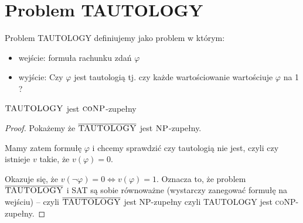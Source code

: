 \section{Problem TAUTOLOGY}

\begin{definition}
	Problem \textsc{TAUTOLOGY} definiujemy jako problem w którym:
	\begin{itemize}
		\item wejście: formuła rachunku zdań \( \varphi \)
		\item wyjście: Czy \( \varphi \) jest tautologią tj. czy każde wartościowanie wartościuje \( \varphi \) na 1 ?
	\end{itemize}
\end{definition}

\begin{theorem}
	\( \textsc{TAUTOLOGY} \) jest \( \textsc{coNP} \)-zupełny
\end{theorem}
\begin{proof}
	Pokażemy że \( \overline{\textsc{TAUTOLOGY}} \) jest \( \textsc{NP} \)-zupełny.

	Mamy zatem formułę \( \varphi \) i chcemy sprawdzić czy tautologią nie jest, czyli czy istnieje \( v \) takie, że \( v(\varphi) = 0 \).

	Okazuje się, że \( v(\lnot \varphi) = 0 \iff v(\varphi) = 1 \). Oznacza to, że problem \( \overline{\textsc{TAUTOLOGY}} \) i \textsc{SAT} są sobie równoważne (wystarczy zanegować formułę na wejściu) -- czyli \( \overline{\textsc{TAUTOLOGY}} \) jest \textsc{NP}-zupełny czyli \textsc{TAUTOLOGY} jest \textsc{coNP}-zupełny.

\end{proof}